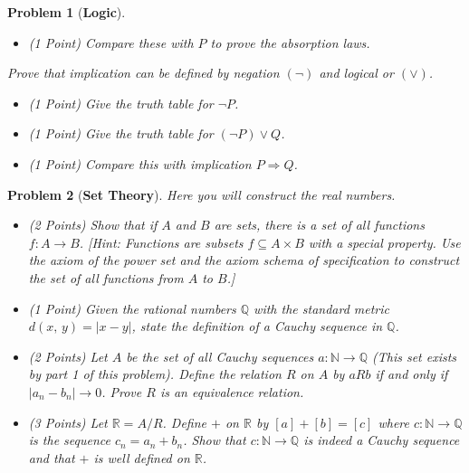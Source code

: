 \documentclass{article}
\theoremstyle{normal}
\newtheorem{problem}{Problem}
\begin{document}
\begin{problem}[\textbf{Logic}]
\begin{itemize}
            \item (1 Point) Compare these with $P$ to prove the absorption laws.
        \end{itemize}
        Prove that implication can be defined by
        \textit{negation} $(\neg)$ and \textit{logical or} $(\lor)$.
        \begin{itemize}
            \item (1 Point) Give the truth table for $\neg{P}$.
            \item (1 Point) Give the truth table for $(\neg{P})\lor{Q}$.
            \item (1 Point) Compare this with implication $P\Rightarrow{Q}$.
        \end{itemize}
    \end{problem}
    \color{black}
    \clearpage
    \begin{problem}[\textbf{Set Theory}]
        \par\hfill\par\vspace{1em}
        Here you will construct the real numbers.
        \begin{itemize}
            \item (2 Points) Show that if $A$ and $B$ are sets, there is a set
                of all functions $f:A\rightarrow{B}$. [Hint: Functions are
                subsets $f\subseteq{A}\times{B}$ with a special property.
                Use the axiom of the power set and the axiom schema of
                specification to construct the set of all functions
                from $A$ to $B$.]
            \item (1 Point) Given the rational numbers $\mathbb{Q}$ with the
                standard metric $d(x,\,y)=|x-y|$, state the definition of a
                Cauchy sequence in $\mathbb{Q}$.
            \item (2 Points) Let $A$ be the set of all Cauchy sequences
                $a:\mathbb{N}\rightarrow\mathbb{Q}$ (This set exists by part 1
                of this problem). Define the relation $R$
                on $A$ by $aRb$ if and only if $|a_{n}-b_{n}|\rightarrow{0}$.
                Prove $R$ is an equivalence relation.
            \item (3 Points) Let $\mathbb{R}=A/R$. Define $+$ on $\mathbb{R}$
                by $[a]+[b]=[c]$ where $c:\mathbb{N}\rightarrow\mathbb{Q}$ is
                the sequence $c_{n}=a_{n}+b_{n}$. Show that
                $c:\mathbb{N}\rightarrow\mathbb{Q}$ is indeed a Cauchy sequence
                and that $+$ is well defined on $\mathbb{R}$.
        \end{itemize}
    \end{problem}
\end{document}
